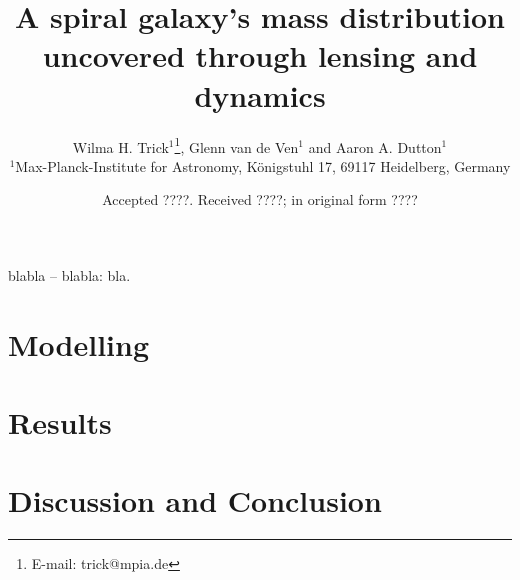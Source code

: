 \documentclass[useAMS,usenatbib]{mn2e}
\title[A spiral galaxy's mass distribution uncovered]{A spiral galaxy's mass distribution uncovered through lensing and dynamics}
\author[W. H. Trick, G. van de Ven and A. A. Dutton]{Wilma H. Trick$^{1}$\thanks{E-mail:
trick@mpia.de}, Glenn van de Ven$^{1}$ and Aaron A. Dutton$^{1}$\\
$^{1}$Max-Planck-Institute for Astronomy, K\"{o}nigstuhl 17, 69117 Heidelberg, Germany}
\begin{document}
\date{Accepted ????. Received ????; in original form ????}

\pagerange{\pageref{firstpage}--\pageref{lastpage}} 

\maketitle

\label{firstpage}

\begin{abstract}

\end{abstract}

\begin{keywords}
blabla -- blabla: bla.
\end{keywords}



\section{Modelling}






\section{Results}





\section{Discussion and Conclusion}







\label{lastpage}
\end{document}
